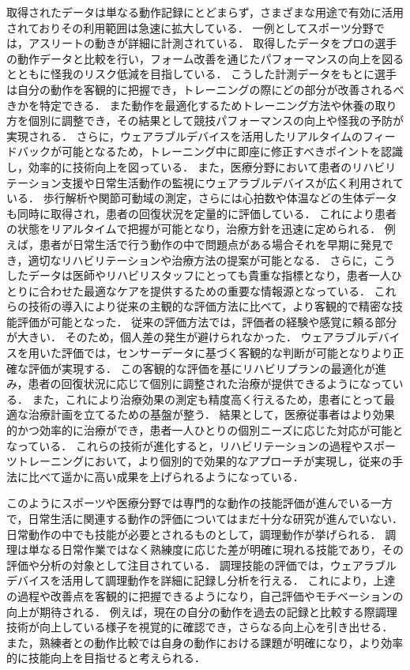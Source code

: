 取得されたデータは単なる動作記録にとどまらず，さまざまな用途で有効に活用されておりその利用範囲は急速に拡大している．
一例としてスポーツ分野では，アスリートの動きが詳細に計測されている\cite{アスリートの動きをリアルタイムに数値化する3Dセンシング技術}．
取得したデータをプロの選手の動作データと比較を行い，フォーム改善を通じたパフォーマンスの向上を図るとともに怪我のリスク低減を目指している．
こうした計測データをもとに選手は自分の動作を客観的に把握でき，トレーニングの際にどの部分が改善されるべきかを特定できる．
また動作を最適化するためトレーニング方法や休養の取り方を個別に調整でき，その結果として競技パフォーマンスの向上や怪我の予防が実現される．
さらに，ウェアラブルデバイスを活用したリアルタイムのフィードバックが可能となるため，トレーニング中に即座に修正すべきポイントを認識し，効率的に技術向上を図っている．
また，医療分野において患者のリハビリテーション支援や日常生活動作の監視にウェアラブルデバイスが広く利用されている\cite{リハビリテーション医療における転倒予防}．
歩行解析や関節可動域の測定，さらには心拍数や体温などの生体データも同時に取得され，患者の回復状況を定量的に評価している．
これにより患者の状態をリアルタイムで把握が可能となり，治療方針を迅速に定められる．
例えば，患者が日常生活で行う動作の中で問題点がある場合それを早期に発見でき，適切なリハビリテーションや治療方法の提案が可能となる．
さらに，こうしたデータは医師やリハビリスタッフにとっても貴重な指標となり，患者一人ひとりに合わせた最適なケアを提供するための重要な情報源となっている．
これらの技術の導入により従来の主観的な評価方法に比べて，より客観的で精密な技能評価が可能となった．
従来の評価方法では，評価者の経験や感覚に頼る部分が大きい．
そのため，個人差の発生が避けられなかった．
ウェアラブルデバイスを用いた評価では，センサーデータに基づく客観的な判断が可能となりより正確な評価が実現する．
この客観的な評価を基にリハビリプランの最適化が進み，患者の回復状況に応じて個別に調整された治療が提供できるようになっている．
また，これにより治療効果の測定も精度高く行えるため，患者にとって最適な治療計画を立てるための基盤が整う．
結果として，医療従事者はより効果的かつ効率的に治療ができ，患者一人ひとりの個別ニーズに応じた対応が可能となっている．
これらの技術が進化すると，リハビリテーションの過程やスポーツトレーニングにおいて，より個別的で効果的なアプローチが実現し，従来の手法に比べて遥かに高い成果を上げられるようになっている．

このようにスポーツや医療分野では専門的な動作の技能評価が進んでいる一方で，日常生活に関連する動作の評価についてはまだ十分な研究が進んでいない．
日常動作の中でも技能が必要とされるものとして，調理動作が挙げられる．
調理は単なる日常作業ではなく熟練度に応じた差が明確に現れる技能であり，その評価や分析の対象として注目されている．
調理技能の評価では，ウェアラブルデバイスを活用して調理動作を詳細に記録し分析を行える．
これにより，上達の過程や改善点を客観的に把握できるようになり，自己評価やモチベーションの向上が期待される．
例えば，現在の自分の動作を過去の記録と比較する際調理技術が向上している様子を視覚的に確認でき，さらなる向上心を引き出せる．
また，熟練者との動作比較では自身の動作における課題が明確になり，より効率的に技能向上を目指せると考えられる．

